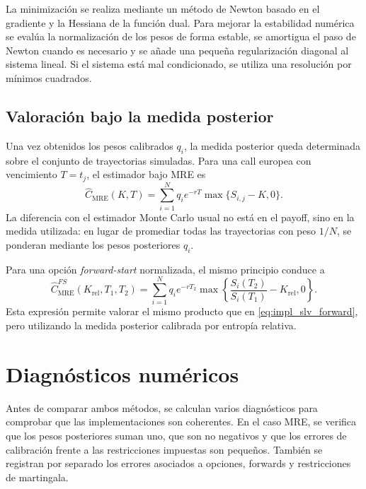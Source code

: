 La minimización se realiza mediante un método de Newton basado en el gradiente y la Hessiana de la función dual. Para mejorar la estabilidad numérica se evalúa la normalización de los pesos de forma estable, se amortigua el paso de Newton cuando es necesario y se añade una pequeña regularización diagonal al sistema lineal. Si el sistema está mal condicionado, se utiliza una resolución por mínimos cuadrados.

\subsection{Valoración bajo la medida posterior}

Una vez obtenidos los pesos calibrados \(q_i\), la medida posterior queda determinada sobre el conjunto de trayectorias simuladas. Para una call europea con vencimiento \(T=t_j\), el estimador bajo MRE es
\begin{equation}
\label{eq:impl_mre_vanilla}
\widehat{C}_{\mathrm{MRE}}(K,T)
=
\sum_{i=1}^N
q_i
e^{-rT}
\max\{S_{i,j}-K,0\}.
\end{equation}
La diferencia con el estimador Monte Carlo usual no está en el payoff, sino en la medida utilizada: en lugar de promediar todas las trayectorias con peso \(1/N\), se ponderan mediante los pesos posteriores \(q_i\).\medskip

Para una opción \textit{forward-start} normalizada, el mismo principio conduce a
\begin{equation}
\label{eq:impl_mre_forward}
\widehat{C}_{\mathrm{MRE}}^{FS}(K_{\mathrm{rel}},T_1,T_2)
=
\sum_{i=1}^N
q_i
e^{-rT_2}
\max\left\{
\frac{S_i(T_2)}{S_i(T_1)}
-
K_{\mathrm{rel}},
0
\right\}.
\end{equation}
Esta expresión permite valorar el mismo producto que en \eqref{eq:impl_slv_forward}, pero utilizando la medida posterior calibrada por entropía relativa.

\section{Diagnósticos numéricos}

Antes de comparar ambos métodos, se calculan varios diagnósticos para comprobar que las implementaciones son coherentes. En el caso MRE, se verifica que los pesos posteriores suman uno, que son no negativos y que los errores de calibración frente a las restricciones impuestas son pequeños. También se registran por separado los errores asociados a opciones, forwards y restricciones de martingala.\medskip


